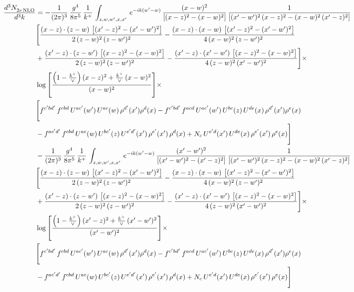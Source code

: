 \documentclass[9pt]{article}
\numberwithin{equation}{section}
\begin{document}
\begin{align}
 \frac{d^{3}N_{2e\,\rm NLO}^{\rm}}{d^{3}k}  & =   -\frac{1}{(2\pi)^{3}}\, \frac{g^{4}}{8\pi^{5}}\,\frac{1}{k^{+}}\,\int_{z,w,w^{\prime},x,x'}\, e^{-ik(w^{\prime}-w)}\,\frac{(x-w)^{2}}{\left[(x-z)^{2}-(x-w)^{2}\right]}\, \frac{1}{\left[(x'-w')^{2}\, (x-z)^{2} - (x-w)^{2}\, (x'-z)^{2}\right]} \notag \\ & \Bigg[\frac{(x-z)\cdot (z-w)\, \left[(x'-z)^{2}-(x'-w')^{2}\right]}{2\, (z-w)^{2}\, (z-w')^{2}}  - \frac{(x-z)\cdot (x-w)\,\left[(x'-z)^{2}-(x'-w')^{2}\right] }{4\,(x-w)^{2}\,(z-w')^{2}}\notag \\ & +\frac{(x'-z)\cdot (z-w')\, \left[(x-z)^{2}-(x-w)^{2}\right]}{2\, (z-w)^{2}\, (z-w')^{2}}-\frac{(x'-z)\cdot (x'-w')\, \left[(x-z)^{2}-(x-w)^{2}\right]}{4\, (z-w)^{2}\,(x'-w')^{2}}\Bigg]\times\,\notag \\ & \log{\left[\frac{\left(1-\frac{k^{+}}{\vee}\right)(x-z)^{2}+\frac{k^{+}}{\vee}\,(x-w)^{2}}{(x-w)^{2}}\right]}\times\,\notag \\ & \Bigg[f^{c'bd'}\,f^{cbd}\, U^{ac'}(w')\,U^{ac}(w)\,\rho^{d'}(x')\rho^{d}(x)- f^{c'bd'}\,f^{acd}\,U^{ac'}(w')\,U^{bc}(z)\,U^{de}(x)\,\rho^{d'}(x')\rho^{e}(x) \notag \\ & -f^{ac'd'}\,f^{cbd}\,U^{ac}(w)\,U^{bc'}(z)\,U^{e'd'}(x')\,\rho^{e'}(x')\,\rho^{d}(x) +N_{c}\,U^{e'd}(x')\,U^{de}(x)\,\rho^{e'}(x')\,\rho^{e}(x)\Bigg] \notag \\
& -\frac{1}{(2\pi)^{3}}\, \frac{g^{4}}{8\pi^{5}}\,\frac{1}{k^{+}}\,\int_{z,w,w^{\prime},x,x'}\, e^{-ik(w^{\prime}-w)}\, \frac{(x'-w')^{2}}{\left[(x'-w')^{2}-(x'-z)^{2}\right]}\, \frac{1}{\left[(x'-w')^{2}\, (x-z)^{2} - (x-w)^{2}\, (x'-z)^{2}\right]}  \notag \\ & \Bigg[\frac{(x-z)\cdot (z-w)\, \left[(x'-z)^{2}-(x'-w')^{2}\right]}{2\, (z-w)^{2}\, (z-w')^{2}}  - \frac{(x-z)\cdot (x-w)\,\left[(x'-z)^{2}-(x'-w')^{2}\right] }{4\,(x-w)^{2}\,(z-w')^{2}}\notag \\ & +\frac{(x'-z)\cdot (z-w')\, \left[(x-z)^{2}-(x-w)^{2}\right]}{2\, (z-w)^{2}\, (z-w')^{2}}-\frac{(x'-z)\cdot (x'-w')\, \left[(x-z)^{2}-(x-w)^{2}\right]}{4\, (z-w)^{2}\,(x'-w')^{2}}\Bigg]\times\,\notag \\ & \log{\left[\frac{\left(1-\frac{k^{+}}{\vee}\right)(x'-z)^{2}+\frac{k^{+}}{\vee}\,(x'-w')^{2}}{(x'-w')^{2}}\right]}\times\notag \\ & \Bigg[f^{c'bd'}\,f^{cbd}\, U^{ac'}(w')\,U^{ac}(w)\,\rho^{d'}(x')\rho^{d}(x)- f^{c'bd'}\,f^{acd}\,U^{ac'}(w')\,U^{bc}(z)\,U^{de}(x)\,\rho^{d'}(x')\rho^{e}(x) \notag \\ & -f^{ac'd'}\,f^{cbd}\,U^{ac}(w)\,U^{bc'}(z)\,U^{e'd'}(x')\,\rho^{e'}(x')\,\rho^{d}(x) +N_{c}\,U^{e'd}(x')\,U^{de}(x)\,\rho^{e'}(x')\,\rho^{e}(x)\Bigg]
\end{align}
\end{document}
